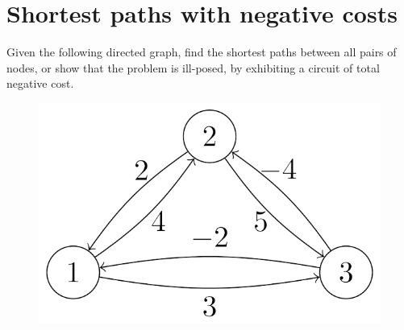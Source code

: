 \documentclass[12pt, a4paper]{report}
\newtheorem[style=M,bodystyle=\normalfont]{theorem}{Theorem}
\newtheorem[style=M,bodystyle=\normalfont]{corollary}{Corollary}
\newtheorem[style=M,bodystyle=\normalfont]{lemma}{Lemma}
\newtheorem[style=M,bodystyle=\normalfont]{definition}{Definition}
\begin{document}
    \newpage

    \section{Shortest paths with negative costs}
        Given the following directed graph, find the shortest paths between all pairs of nodes, or show that the problem is ill-posed, by exhibiting a circuit of total 
        negative cost.
        \begin{figure}[H]
            \centering
            \includegraphics[width=0.3\linewidth]{images/neg1.png}
        \end{figure}
\end{document}
